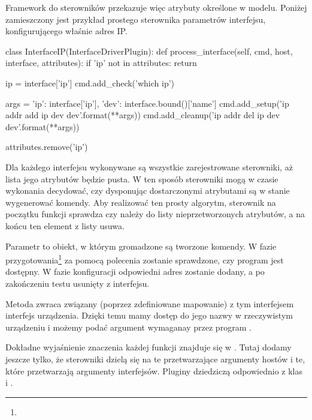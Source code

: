 \documentclass[00-praca-magisterska.tex]{subfiles}
\begin{document}
Framework do sterowników przekazuje więc atrybuty określone w modelu. Poniżej
zamieszczony jest przykład prostego sterownika parametrów interfejsu,
konfigurującego właśnie adres IP.

\begin{pythoncode}
  class InterfaceIP(InterfaceDriverPlugin):
      def process_interface(self, cmd, host, interface, attributes):
          if 'ip' not in attributes:
              return
  
          ip = interface['ip']
          cmd.add_check('which ip')
  
          args = {'ip': interface['ip'],
                  'dev': interface.bound()['name']}
          cmd.add_setup('ip addr add {ip} dev {dev}'.format(**args))
          cmd.add_cleanup('ip addr del {ip} dev {dev}'.format(**args))
  
          attributes.remove('ip')

\end{pythoncode}

Dla każdego interfejsu wykonywane są wszystkie zarejestrowane sterowniki, aż
lista jego atrybutów będzie pusta. W ten sposób sterowniki mogą w czasie
wykonania decydować, czy dysponując dostarczonymi atrybutami są w stanie
wygenerować komendy. Aby realizować ten prosty algorytm, sterownik na początku
funkcji  sprawdza czy  należy do listy
nieprzetworzonych atrybutów, a na końcu ten element z listy usuwa.

Parametr  to obiekt, w którym gromadzone są tworzone komendy. W fazie
przygotowania\footnote{} za pomocą polecenia 
zostanie sprawdzone, czy program  jest dostępny. W fazie konfiguracji
odpowiedni adres zostanie dodany, a po zakończeniu testu usunięty z interfejsu.

Metoda  zwraca związany (poprzez zdefiniowane
mapowanie) z tym interfejsem interfejs urządzenia. Dzięki temu mamy dostęp do
jego nazwy w rzeczywistym urządzeniu i możemy podać argument wymaganay przez
program .

Dokładne wyjaśnienie znaczenia każdej funkcji znajduje się w . Tutaj dodamy jeszcze tylko, że sterowniki dzielą się na te
przetwarzające argumenty hostów i te, które przetwarzają argumenty interfejsów.
Pluginy dziedziczą odpowiednio z klas  i
.
\end{document}
